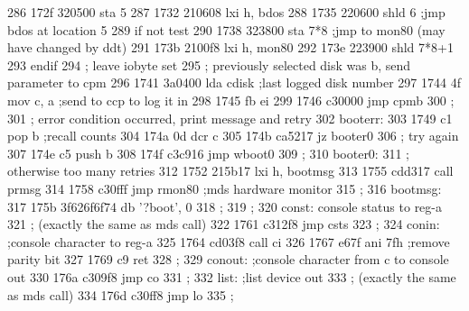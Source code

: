 286      172f 320500               sta      5
287      1732 210608               lxi      h, bdos
288      1735 220600               shld     6          ;jmp bdos at location 5
289                                if       not test
290      1738 323800               sta      7*8        ;jmp to mon80 (may have changed by ddt)
291      173b 2100f8               lxi      h, mon80
292      173e 223900               shld     7*8+1
293                                endif
294                       ;        leave iobyte set
295                       ;        previously selected disk was b, send parameter to cpm
296      1741 3a0400               lda      cdisk      ;last logged disk number
297      1744 4f                   mov      c, a       ;send to ccp to log it in
298      1745 fb                   ei
299      1746 c30000               jmp      cpmb
300                       ;
301                       ;        error condition occurred, print message and retry
302                       booterr:
303      1749 c1                   pop      b          ;recall counts
304      174a 0d                   dcr      c          
305      174b ca5217               jz       booter0
306                       ;        try again
307      174e c5                   push     b
308      174f c3c916               jmp      wboot0
309                       ;
310                       booter0:
311                       ;        otherwise too many retries
312      1752 215b17               lxi      h, bootmsg
313      1755 cdd317               call     prmsg
314      1758 c30fff               jmp      rmon80     ;mds hardware monitor
315                       ;
316                       bootmsg:
317      175b 3f626f6f74           db       '?boot', 0
318                       ;
319                       ;
320                       const:   console status to reg-a
321                       ;        (exactly the same as mds call)
322      1761 c312f8               jmp      csts
323                       ;
324                       conin:   ;console character to reg-a
325      1764 cd03f8               call     ci
326      1767 e67f                 ani      7fh        ;remove parity bit
327      1769 c9                   ret
328                       ;
329                       conout:  ;console character from c to console out
330      176a c309f8               jmp      co
331                       ;
332                       list:    ;list device out
333                       ;        (exactly the same as mds call)
334      176d c30ff8               jmp      lo
335                       ;
